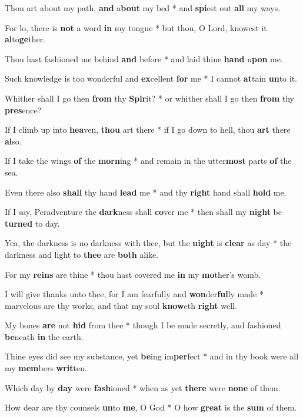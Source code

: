 \begin{multicols}{2}
	Thou art about my path, \textbf{and} a\textbf{bout} my bed * and \textbf{spi}est out \textbf{all} my ways.
	
	For lo, there is \textbf{not} a word \textbf{in} my tongue * but thou, O Lord, knowest it \textbf{al}to\textbf{ge}ther.
	
	Thou hast fashioned me behind \textbf{and} before * and laid thine \textbf{hand} u\textbf{pon} me.
	
	Such knowledge is too wonderful and \textbf{ex}cellent \textbf{for} me * I cannot \textbf{at}tain \textbf{un}to it.
	
	Whither shall I go then \textbf{from} thy \textbf{Spir}it? * or whither shall I go then \textbf{from} thy \textbf{pres}ence?
	
	If I climb up into \textbf{hea}ven, \textbf{thou} art there * if I go down to hell, thou \textbf{art} there \textbf{al}so.
	
	If I take the wings \textbf{of} the \textbf{morn}ing * and remain in the utter\textbf{most} parts \textbf{of} the sea.
	
	Even there also \textbf{shall} thy hand \textbf{lead} me * and thy \textbf{right} hand shall \textbf{hold} me.
	
	If I say, Peradventure the \textbf{dark}ness shall \textbf{co}ver me * then shall my \textbf{night} be \textbf{turned} to day.
	
	Yea, the darkness is no darkness with thee, but the \textbf{night} is \textbf{clear} as day * the darkness and light to \textbf{thee} are \textbf{both} alike.
	
	For my \textbf{reins} are thine * thou hast covered me \textbf{in} my \textbf{mo}ther's womb.
	
	I will give thanks unto thee, for I am fearfully and \textbf{won}der\textbf{ful}ly made * marvelous are thy works, and that my soul \textbf{know}eth \textbf{right} well.
	
	My bones \textbf{are} not \textbf{hid} from thee * though I be made secretly, and fashioned \textbf{be}neath \textbf{in} the earth.
	
	Thine eyes did see my substance, yet \textbf{be}ing im\textbf{per}fect * and in thy book were all my \textbf{mem}bers \textbf{writ}ten.
	
	Which day by \textbf{day} were \textbf{fash}ioned * when as yet \textbf{there} were \textbf{none} of them.
	
	How dear are thy counsels \textbf{un}to \textbf{me}, O God * O how \textbf{great} is the \textbf{sum} of them.
	

\end{multicols}
